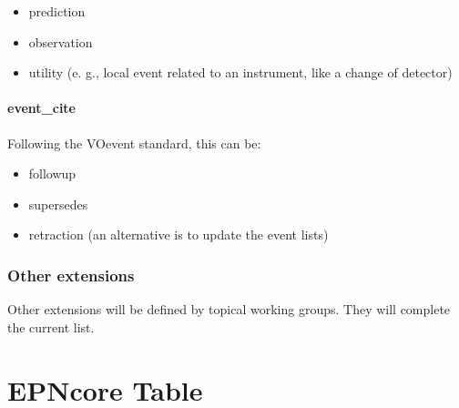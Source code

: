\documentclass[11pt,a4paper]{ivoa}
\begin{document}
\begin{itemize}

\item prediction

\item observation

\item utility (e. g., local event related to an instrument, like a change of detector)

\end{itemize}

\paragraph{event\_cite}

Following the VOevent standard, this can be:

\begin{itemize}

\item followup

\item supersedes

\item retraction (an alternative is to update the event lists)

\end{itemize}

\subsubsection{Other extensions\\}

Other extensions will be defined by topical working groups. They will complete the current list.





\section{EPNcore Table}
\end{document}
